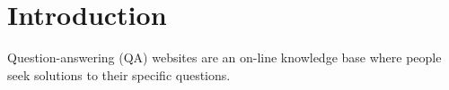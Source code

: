 \section{Introduction} 

Question-answering (QA) websites are an on-line knowledge base where people seek solutions to their specific questions. 